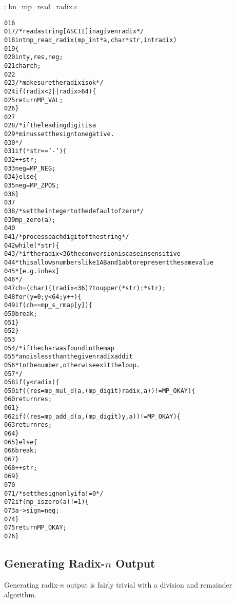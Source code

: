 \documentclass[b5paper]{book}
\begin{document}
\vspace{+3mm}\begin{small}
\hspace{-5.1mm}{\bf File}: bn\_mp\_read\_radix.c
\vspace{-3mm}
\begin{alltt}
016   
017   /* read a string [ASCII] in a given radix */
018   int mp_read_radix (mp_int * a, char *str, int radix)
019   \{
020     int     y, res, neg;
021     char    ch;
022   
023     /* make sure the radix is ok */
024     if (radix < 2 || radix > 64) \{
025       return MP_VAL;
026     \}
027   
028     /* if the leading digit is a 
029      * minus set the sign to negative. 
030      */
031     if (*str == '-') \{
032       ++str;
033       neg = MP_NEG;
034     \} else \{
035       neg = MP_ZPOS;
036     \}
037   
038     /* set the integer to the default of zero */
039     mp_zero (a);
040     
041     /* process each digit of the string */
042     while (*str) \{
043       /* if the radix < 36 the conversion is case insensitive
044        * this allows numbers like 1AB and 1ab to represent the same  value
045        * [e.g. in hex]
046        */
047       ch = (char) ((radix < 36) ? toupper (*str) : *str);
048       for (y = 0; y < 64; y++) \{
049         if (ch == mp_s_rmap[y]) \{
050            break;
051         \}
052       \}
053   
054       /* if the char was found in the map 
055        * and is less than the given radix add it
056        * to the number, otherwise exit the loop. 
057        */
058       if (y < radix) \{
059         if ((res = mp_mul_d (a, (mp_digit) radix, a)) != MP_OKAY) \{
060            return res;
061         \}
062         if ((res = mp_add_d (a, (mp_digit) y, a)) != MP_OKAY) \{
063            return res;
064         \}
065       \} else \{
066         break;
067       \}
068       ++str;
069     \}
070     
071     /* set the sign only if a != 0 */
072     if (mp_iszero(a) != 1) \{
073        a->sign = neg;
074     \}
075     return MP_OKAY;
076   \}
\end{alltt}
\end{small}

\subsection{Generating Radix-$n$ Output}
Generating radix-$n$ output is fairly trivial with a division and remainder algorithm.  
\end{document}
